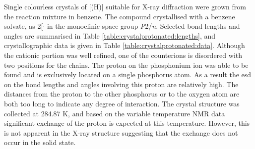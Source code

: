 


Single colourless crystals of [\tButhixantphos(H)] suitable for X-ray diffraction were grown from the reaction mixture in benzene.  The compound crystallised with a benzene solvate, as 2[\tButhixantphos{}\ce{(H)]CPh(SO2CF3)2}$\cdot{}$ in the monoclinic space group \emph{P}2/\emph{n}.  Selected bond lengths and angles are summarised in Table \ref{table:crystalprotonated:lengths}, and crystallographic data is given in Table \ref{table:crystalprotonated:data}.  Although the cationic portion was well refined, one of the counterions is disordered with two positions for the  chains.  The proton on the phosphonium ion was able to be found and is exclusively located on a single phosphorus atom.  As a result the \gls{esd} on the bond lengths and angles involving this proton are relatively high.  The distances from the proton to the other phosphorus or to the oxygen atom are both too long to indicate any degree of interaction.  The crystal structure was collected at 284.87 K, and based on the variable temperature NMR data significant exchange of the proton is expected at this temperature.  However, this is not apparent in the X-ray structure suggesting that the exchange does not occur in the solid state.  

